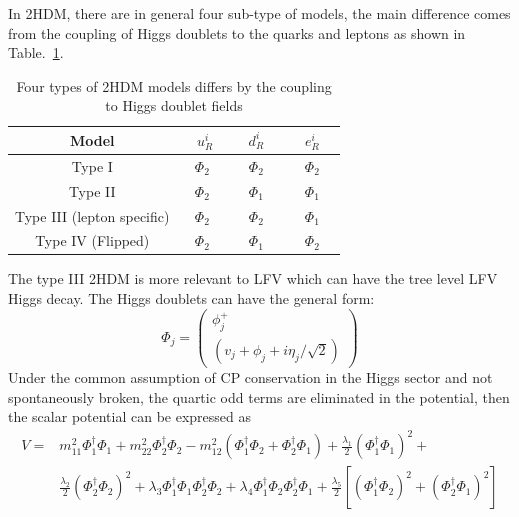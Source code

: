 In 2HDM, there are in general four sub-type of models, the main difference comes from the coupling of Higgs doublets to the quarks and leptons as shown in Table.~\ref{2HDM_models}.
\begin{table}[htp!]
\caption{Four types of 2HDM models differs by the coupling to Higgs doublet fields}
\begin{center}
\begin{tabular}{|c|c|c|c|}
\hline
Model                                 &~  $u^{i}_{R}$~  &~  $d^{i}_{R}$ ~   &~   $e^{i}_{R}$ ~\\\hline
Type I                                 &  $\Phi_{2}$    &  $\Phi_{2}$     &  $\Phi_{2}$   \\\hline
Type II                                &  $\Phi_{2}$    &  $\Phi_{1}$     &  $\Phi_{1}$   \\\hline
Type III (lepton specific)     &  $\Phi_{2}$    &  $\Phi_{2}$     &  $\Phi_{1}$   \\\hline
Type IV (Flipped)                &  $\Phi_{2}$    &  $\Phi_{1}$     &  $\Phi_{2}$   \\\hline
\end{tabular}
\end{center}
\label{2HDM_models}
\end{table}
The type III 2HDM is more relevant to LFV which can have the tree level LFV Higgs decay. The Higgs doublets can have the general form:
\begin{equation}
\Phi_{j}=
\begin{pmatrix}
\phi^{+}_{j}    \\
(v_{j}+\phi_{j}+i\eta_{j}/\sqrt{2})
\end{pmatrix}
\end{equation}
Under the common assumption of CP conservation in the Higgs sector and not spontaneously broken, the quartic odd terms are eliminated in the potential, then the scalar potential can be expressed as
\begin{equation}
\begin{aligned}
V=&m^{2}_{11}\Phi^{\dagger}_{1}\Phi_{1}+m^{2}_{22}\Phi^{\dagger}_{2}\Phi_{2}-m^{2}_{12}(\Phi^{\dagger}_{1}\Phi_{2}+\Phi^{\dagger}_{2}\Phi_{1})+\frac{\lambda_{1}}{2}(\Phi^{\dagger}_{1}\Phi_{1})^{2}+\\
  &\frac{\lambda_{2}}{2}(\Phi^{\dagger}_{2}\Phi_{2})^{2}+\lambda_{3}\Phi^{\dagger}_{1}\Phi_{1}\Phi^{\dagger}_{2}\Phi_{2}+\lambda_{4}\Phi^{\dagger}_{1}\Phi_{2}\Phi^{\dagger}_{2}\Phi_{1}+\frac{\lambda_{5}}{2}[(\Phi^{\dagger}_{1}\Phi_{2})^{2}+(\Phi^{\dagger}_{2}\Phi_{1})^{2}]
  \end{aligned}
\end{equation}
